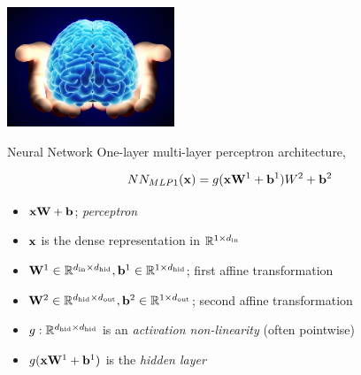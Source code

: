 \documentclass{beamer}
\begin{document}
\begin{frame}
  \begin{center}
    \includegraphics[width=5cm]{brain}
  \end{center}
\end{frame}

\begin{frame}{Neural Network}
  One-layer multi-layer perceptron architecture,

  \[NN_{MLP1}(\mathbf{x}) =  g(\mathbf{x}\mathbf{W}^1 + \mathbf{b}^1)W^2 + \mathbf{b}^2\]
  \begin{itemize}
  \item $\mathbf{x}\mathbf{W} + \mathbf{b}$; \textit{perceptron}
  \item $\mathbf{x}$ is the dense representation in $\mathbb{R}^{1 \times {d_{\mathrm{in}}}}$
  \item $\mathbf{W}^1 \in \mathbb{R}^{{d_{\mathrm{in}}} \times {d_{\mathrm{hid}}}}, \mathbf{b}^1 \in \mathbb{R}^{1 \times {d_{\mathrm{hid}}}}$; first affine transformation
  \item $\mathbf{W}^2 \in \mathbb{R}^{{d_{\mathrm{hid}}} \times {d_{\mathrm{out}}}}, \mathbf{b}^2 \in \mathbb{R}^{1 \times {d_{\mathrm{out}}}}$; second affine transformation
  \item $g:\mathbb{R}^{{d_{\mathrm{hid}}} \times {d_{\mathrm{hid}}}}$ is an \textit{activation non-linearity} (often pointwise)
  \item $g(\mathbf{x}\mathbf{W}^1 + \mathbf{b}^1)$ is the \textit{hidden layer}
  \end{itemize}
\end{frame}
\end{document}
